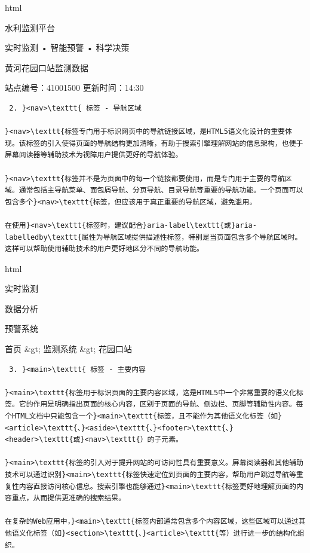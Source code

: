 html

水利监测平台

实时监测 • 智能预警 • 科学决策

黄河花园口站监测数据

站点编号：41001500 \textbar{} 更新时间：14:30

\begin{lstlisting}
 2. }<nav>\texttt{ 标签 - 导航区域

}<nav>\texttt{标签专门用于标识网页中的导航链接区域，是HTML5语义化设计的重要体现。该标签的引入使得页面的导航结构更加清晰，有助于搜索引擎理解网站的信息架构，也便于屏幕阅读器等辅助技术为视障用户提供更好的导航体验。

}<nav>\texttt{标签并不是为页面中的每一个链接都要使用，而是专门用于主要的导航区域。通常包括主导航菜单、面包屑导航、分页导航、目录导航等重要的导航功能。一个页面可以包含多个}<nav>\texttt{标签，但应该用于真正重要的导航区域，避免滥用。

在使用}<nav>\texttt{标签时，建议配合}aria-label\texttt{或}aria-labelledby\texttt{属性为导航区域提供描述性标签，特别是当页面包含多个导航区域时。这样可以帮助使用辅助技术的用户更好地区分不同的导航功能。
\end{lstlisting}

html

实时监测

数据分析

预警系统

首页 \&gt; 监测系统 \&gt; {花园口站}

\begin{lstlisting}
 3. }<main>\texttt{ 标签 - 主要内容

}<main>\texttt{标签用于标识页面的主要内容区域，这是HTML5中一个非常重要的语义化标签。它的作用是明确指出页面的核心内容，区别于页面的导航、侧边栏、页脚等辅助性内容。每个HTML文档中只能包含一个}<main>\texttt{标签，且不能作为其他语义化标签（如}<article>\texttt{、}<aside>\texttt{、}<footer>\texttt{、}<header>\texttt{或}<nav>\texttt{）的子元素。

}<main>\texttt{标签的引入对于提升网站的可访问性具有重要意义。屏幕阅读器和其他辅助技术可以通过识别}<main>\texttt{标签快速定位到页面的主要内容，帮助用户跳过导航等重复性内容直接访问核心信息。搜索引擎也能够通过}<main>\texttt{标签更好地理解页面的内容重点，从而提供更准确的搜索结果。

在复杂的Web应用中，}<main>\texttt{标签内部通常包含多个内容区域，这些区域可以通过其他语义化标签（如}<section>\texttt{、}<article>\texttt{等）进行进一步的结构化组织。
\end{lstlisting}

